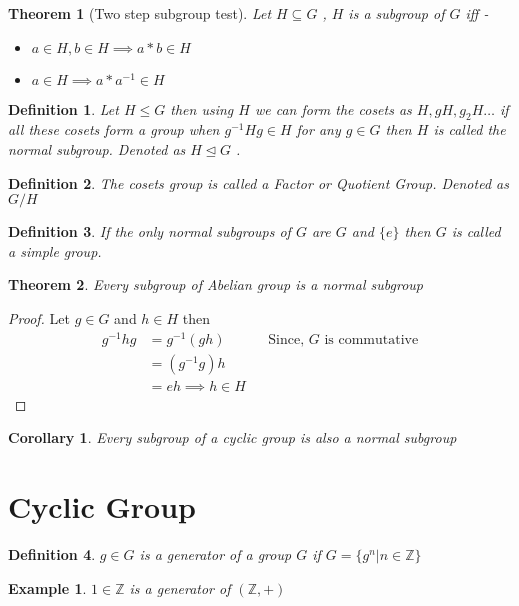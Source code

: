 \documentclass[12pt,a4paper]{article}
\newcommand{\Z}{\mathbb{Z}}
\newtheorem{thm}{Theorem}
\newtheorem*{defn}{Definition}
\newtheorem*{cor}{Corollary}
\newtheorem{ex}{Example}
\begin{document}
\begin{thm}[Two step subgroup test]
	Let $H \subseteq G$ , $H$ is a subgroup of $G$ iff -
	\begin{itemize}
		\item $a \in H, b\in H \implies a*b \in H$
		\item $a \in H \implies a*a^{-1} \in H$
	\end{itemize}
\end{thm}
\begin{defn}
	Let $H \le G$ then using $H$ we can form the cosets as $H, gH, g_{2}H \dots$ if all these cosets form a group when $g^{-1}Hg \in H$ for any $g\in G$ then $H$ is called the normal subgroup. Denoted as $H \trianglelefteq G$ .
\end{defn}
\begin{defn}
	The cosets group is called a Factor or Quotient Group. Denoted as $G/H$
\end{defn}
\begin{defn}
	If the only normal subgroups of $G$ are $G$ and $\{e\}$ then $G$ is called a simple group.
\end{defn}

\begin{thm}
	Every subgroup of Abelian group is a normal subgroup
\end{thm}
\begin{proof}
	Let $g\in G$ and $h \in H$ then
	\begin{align*}
		g^{-1}hg &= g^{-1}(gh)		&& \text{Since, $G$ is commutative} \\
			     &= (g^{-1}g)h \\
			     &= eh \implies h \in H
	\end{align*}
\end{proof}
\begin{cor}
	Every subgroup of a cyclic group is also a normal subgroup
\end{cor}

\section{Cyclic Group}
\begin{defn}
	$g\in G$ is a generator of a group $G$ if $G=\{g^n | n\in \Z\}$
\end{defn}
\begin{ex}
	$1 \in \Z$ is a generator of $(\Z, +)$
\end{ex}
\end{document}
